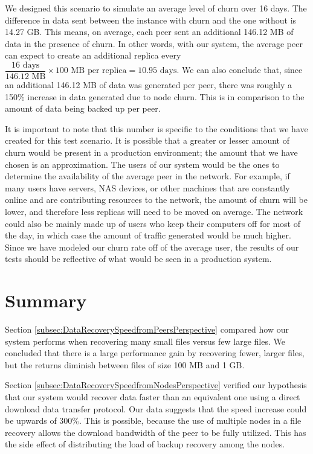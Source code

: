 \documentclass[12pt]{report}
\begin{document}
We designed this scenario to simulate an average level of churn over 16 days. The difference in data sent between the instance with churn and the one without is 14.27 GB. This means, on average, each peer sent an additional 146.12 MB of data in the presence of churn. In other words, with our system, the average peer can expect to create an additional replica every $\dfrac{16 \text{ days}}{146.12 \text{ MB}} \times 100 \text{ MB per replica} = 10.95 \text{ days}$. We can also conclude that, since an additional 146.12 MB of data was generated per peer, there was roughly a 150\% increase in data generated due to node churn. This is in comparison to the amount of data being backed up per peer.

It is important to note that this number is specific to the conditions that we have created for this test scenario. It is possible that a greater or lesser amount of churn would be present in a production environment; the amount that we have chosen is an approximation. The users of our system would be the ones to determine the availability of the average peer in the network. For example, if many users have servers, NAS devices, or other machines that are constantly online and are contributing resources to the network, the amount of churn will be lower, and therefore less replicas will need to be moved on average. The network could also be mainly made up of users who keep their computers off for most of the day, in which case the amount of traffic generated would be much higher. Since we have modeled our churn rate off of the average user, the results of our tests should be reflective of what would be seen in a production system.

\section{Summary}

Section \ref{subsec:DataRecoverySpeedfromPeersPerspective} compared how our system performs when recovering many small files versus few large files. We concluded that there is a large performance gain by recovering fewer, larger files, but the returns diminish between files of size 100 MB and 1 GB.

Section \ref{subsec:DataRecoverySpeedfromNodesPerspective} verified our hypothesis that our system would recover data faster than an equivalent one using a direct download data transfer protocol. Our data suggests that the speed increase could be upwards of 300\%. This is possible, because the use of multiple nodes in a file recovery allows the download bandwidth of the peer to be fully utilized. This has the side effect of distributing the load of backup recovery among the nodes.
\end{document}

